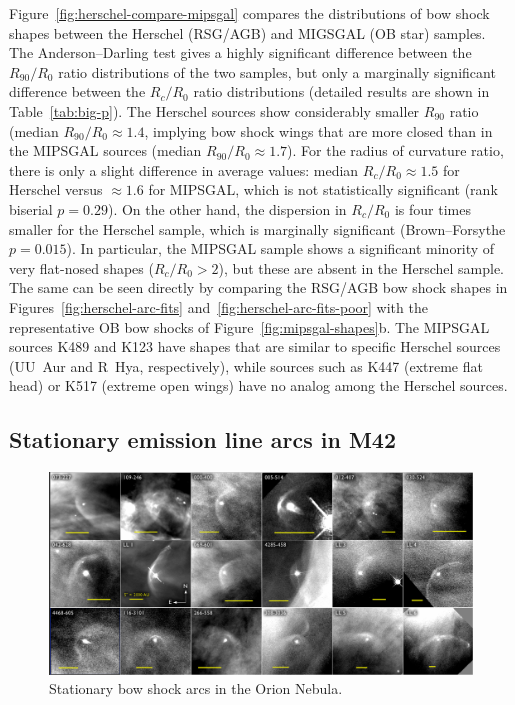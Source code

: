 Figure~\ref{fig:herschel-compare-mipsgal} compares the distributions
of bow shock shapes between the Herschel (RSG/AGB) and MIGSGAL (OB
star) samples.  The Anderson--Darling test gives a highly significant
difference between the \(R_{90}/R_0\) ratio distributions of the two
samples, but only a marginally significant difference between the
\(R_c/R_0\) ratio distributions (detailed results are shown in
Table~\ref{tab:big-p}).  The Herschel sources show considerably
smaller \(R_{90}\) ratio (median \(R_{90}/R_0 \approx 1.4\), implying bow
shock wings that are more closed than in the MIPSGAL sources (median
\(R_{90}/R_0 \approx 1.7\)).  For the radius of curvature ratio, there is
only a slight difference in average values: median
\(R_c/R_0 \approx 1.5\) for Herschel versus \(\approx 1.6\) for MIPSGAL, which is
not statistically significant (rank biserial \(p = 0.29\)).  On the
other hand, the dispersion in \(R_c/R_0\) is four times smaller for
the Herschel sample, which is marginally significant (Brown--Forsythe
\(p = 0.015\)).  In particular, the MIPSGAL sample shows a significant
minority of very flat-nosed shapes (\(R_c/R_0 > 2\)), but these are
absent in the Herschel sample.  The same can be seen directly by
comparing the RSG/AGB bow shock shapes in
Figures~\ref{fig:herschel-arc-fits}
and~\ref{fig:herschel-arc-fits-poor} with the representative OB bow
shocks of Figure~\ref{fig:mipsgal-shapes}b.  The MIPSGAL sources K489
and K123 have shapes that are similar to specific Herschel sources
(UU~Aur and R~Hya, respectively), while sources such as K447 (extreme
flat head) or K517 (extreme open wings) have no analog among the
Herschel sources.



\subsection{Stationary emission line arcs in M42}
\label{sec:stat-emiss-line}

\begin{figure}
  \centering
  \includegraphics[width=\linewidth]{figs/annotated-ll-arcs}
  \caption[]{Stationary bow shock arcs in the Orion Nebula.}
  \label{fig:ll-arcs}
\end{figure}

